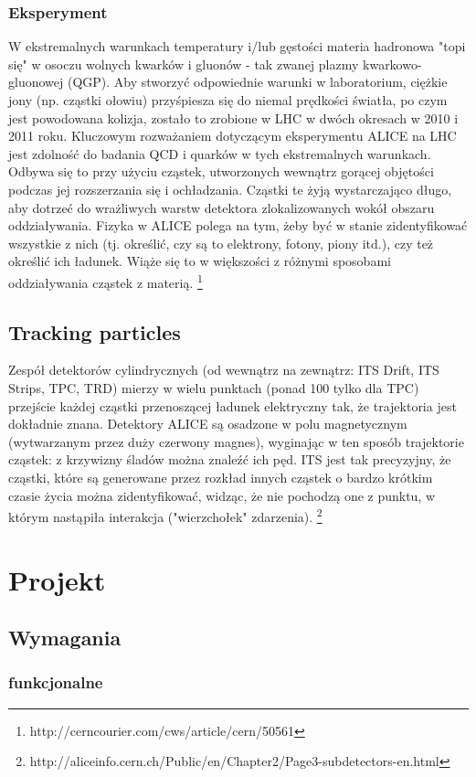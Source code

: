 \subsubsection{Eksperyment}
W ekstremalnych warunkach temperatury i/lub gęstości materia hadronowa "topi się" w osoczu wolnych kwarków i gluonów - tak zwanej plazmy kwarkowo-gluonowej (QGP). Aby stworzyć odpowiednie warunki w laboratorium, ciężkie jony (np. cząstki ołowiu) przyśpiesza się do niemal prędkości światła, po czym jest powodowana kolizja, zostało to zrobione w LHC w dwóch okresach w 2010 i 2011 roku. Kluczowym rozważaniem dotyczącym eksperymentu ALICE na LHC jest zdolność do badania QCD i quarków w tych ekstremalnych warunkach. Odbywa się to przy użyciu cząstek, utworzonych wewnątrz gorącej objętości podczas jej rozszerzania się i ochładzania. Cząstki te żyją wystarczająco długo, aby dotrzeć do wrażliwych warstw detektora zlokalizowanych wokół obszaru oddziaływania. Fizyka w ALICE polega na tym, żeby być w stanie zidentyfikować wszystkie z nich (tj. określić, czy są to elektrony, fotony, piony itd.), czy też określić ich ładunek. Wiąże się to w większości z różnymi sposobami oddziaływania cząstek z materią. \footnote{http://cerncourier.com/cws/article/cern/50561}
\subsection{Tracking particles}
Zespół detektorów cylindrycznych (od wewnątrz na zewnątrz: ITS Drift, ITS Strips, TPC, TRD) mierzy w wielu punktach (ponad 100 tylko dla TPC) przejście każdej cząstki przenoszącej ładunek elektryczny tak, że trajektoria jest dokładnie znana. Detektory ALICE są osadzone w polu magnetycznym (wytwarzanym przez duży czerwony magnes), wyginając w ten sposób trajektorie cząstek: z krzywizny śladów można znaleźć ich pęd. ITS jest tak precyzyjny, że cząstki, które są generowane przez rozkład innych cząstek o bardzo krótkim czasie życia można zidentyfikować, widząc, że nie pochodzą one z punktu, w którym nastąpiła interakcja ("wierzchołek" zdarzenia).
\footnote{http://aliceinfo.cern.ch/Public/en/Chapter2/Page3-subdetectors-en.html}

\newpage
\section{Projekt}
\subsection{Wymagania}
\subsubsection{funkcjonalne}
